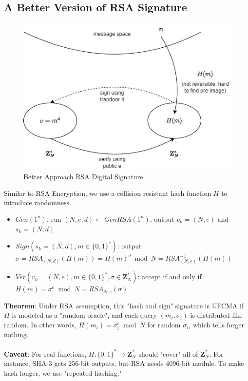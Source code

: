\documentclass{scribe}
\begin{document}
\subsection{A Better Version of RSA Signature}
\begin{figure}[H]
    \centering
    \includegraphics[scale=0.5]{better_approach.jpg}
    \caption{Better Approach RSA Digital Signature}
\end{figure}
Similar to RSA Encryption, we use a collision resistant hash function $H$ to introduce randomness.
\begin{itemize}
    \item $Gen(1^n)$: run $(N,e,d) \leftarrow GenRSA(1^n)$, output $v_k = (N,e)$ and $s_k = (N,d)$
    \item $Sign(s_k=(N,d), m \in \{0,1\}^*)$: output $\sigma = RSA_{(N,d)}(H(m)) = H(m)^d \bmod N = RSA_{(N,e)}^{-1}(H(m))$
    \item $Ver(v_k=(N,e), m \in \{0,1\}^*, \sigma \in \mathbf{Z}_N^*)$: accept if and only if $H(m) = \sigma^e \bmod N  = RSA_{N,e}(\sigma)$
\end{itemize}
\textbf{Theorem}: Under RSA assumption, this "hash and sign" signature is UFCMA if $H$ is modeled as a "random oracle", and each query $(m_i, \sigma_i)$ is distributed like random. In other words, $H(m_i) = \sigma_i^e \bmod N$ for random $\sigma_i$, which tells forger nothing.
\\\\
\textbf{Caveat}: For real functions, $H:\{0,1\}^* \rightarrow \mathbf{Z}_N^*$ should "cover" all of $\mathbf{Z}_N^*$. For instance, SHA-3 gets 256-bit outputs, but RSA needs 4096-bit module. To make hash longer, we use "repeated hashing."
\vspace{10mm}




%

\end{document}

